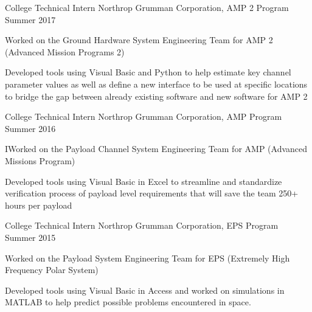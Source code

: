 \vspace{-2mm}
\vspace{-2mm}


\begin{cventries}
  \cventry
    {College Technical Intern} %
    {Northrop Grumman Corporation, AMP 2 Program} %
    {Summer 2017} %
    {} %
    {
      \begin{cvitems} %
        \item {Worked on the Ground Hardware System Engineering Team for AMP 2 (Advanced Mission Programs 2)}
        \item {Developed tools using Visual Basic and Python to help estimate key channel parameter values as well as define a new interface to be used at specific locations to bridge the gap between already existing software and new software for AMP 2}
      \end{cvitems}
    }


  \cventry
    {College Technical Intern} %
    {Northrop Grumman Corporation, AMP Program} %
    {Summer 2016} %
    {} %
    {
      \begin{cvitems} %
        \item {IWorked on the Payload Channel System Engineering Team for AMP (Advanced Missions Program)}
        \item {Developed tools using Visual Basic in Excel to streamline and standardize verification process of payload level requirements that will save the team 250+ hours per payload}
      \end{cvitems}
    }

  \cventry
    {College Technical Intern} %
    {Northrop Grumman Corporation, EPS Program} %
    {Summer 2015} %
    {} %
    {
      \begin{cvitems} %
        \item {Worked on the Payload System Engineering Team for EPS (Extremely High Frequency Polar System)}
        \item {Developed tools using Visual Basic in Access and worked on simulations in MATLAB to help predict possible problems encountered in space.}
      \end{cvitems}
    }


\end{cventries}
